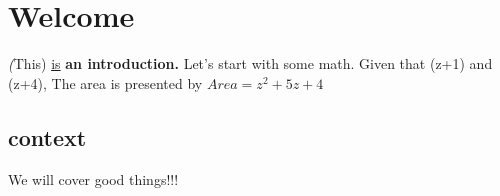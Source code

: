 \documentclass[11pt]{article}
\begin{document}
\section {Welcome}
\textit(This) \underline{is} \textbf{an introduction.}
Let's start with some math. Given that (z+1) and (z+4),
The area is presented by $Area=z^2+5z+4$
\subsection[10]{context} We will cover good things!!!
\end{document}
